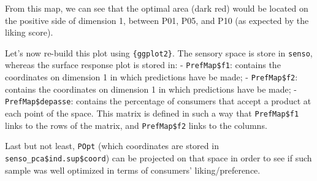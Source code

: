 \documentclass[
]{book}
\newenvironment{Shaded}{\begin{snugshade}}{\end{snugshade}}
\newcommand{\AttributeTok}[1]{\textcolor[rgb]{0.77,0.63,0.00}{#1}}
\newcommand{\ConstantTok}[1]{\textcolor[rgb]{0.00,0.00,0.00}{#1}}
\newcommand{\DecValTok}[1]{\textcolor[rgb]{0.00,0.00,0.81}{#1}}
\newcommand{\FunctionTok}[1]{\textcolor[rgb]{0.00,0.00,0.00}{#1}}
\newcommand{\NormalTok}[1]{#1}
\newcommand{\OtherTok}[1]{\textcolor[rgb]{0.56,0.35,0.01}{#1}}
\newcommand{\SpecialCharTok}[1]{\textcolor[rgb]{0.00,0.00,0.00}{#1}}
\newcommand{\StringTok}[1]{\textcolor[rgb]{0.31,0.60,0.02}{#1}}
\begin{document}
\begin{Shaded}
\end{Shaded}

From this map, we can see that the optimal area (dark red) would be located on the positive side of dimension 1, between P01, P05, and P10 (as expected by the liking score).

Let's now re-build this plot using \texttt{\{ggplot2\}}.
The sensory space is store in \texttt{senso}, whereas the surface response plot is stored in:
- \texttt{PrefMap\$f1}: contains the coordinates on dimension 1 in which predictions have be made;
- \texttt{PrefMap\$f2}: contains the coordinates on dimension 1 in which predictions have be made;
- \texttt{PrefMap\$depasse}: contains the percentage of consumers that accept a product at each point of the space. This matrix is defined in such a way that \texttt{PrefMap\$f1} links to the rows of the matrix, and \texttt{PrefMap\$f2} links to the columns.

Last but not least, \texttt{POpt} (which coordinates are stored in \texttt{senso\_pca\$ind.sup\$coord}) can be projected on that space in order to see if such sample was well optimized in terms of consumers' liking/preference.
\end{document}
